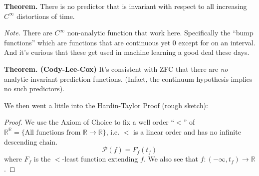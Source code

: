 \documentclass[12pt]{amsart}
\begin{document}
\begin{onehalfspace}
        \noindent\textbf{Theorem.} There is no predictor that is invariant with respect to all increasing $C^\infty$ distortions of
        time.

        \emph{Note.} There are $C^\infty$ non-analytic function that work here. Specifically the ``bump functions'' which
        are functions that are continuous yet 0 except for on an interval. And it's curious that these get used in machine
        learning a good deal these days.

        \noindent\textbf{Theorem. (Cody-Lee-Cox)} It's consistent with ZFC that there are \emph{no} analytic-invariant
        prediction functions. (Infact, the continuum hypothesis implies no such predictors).

        We then went a little into the Hardin-Taylor Proof (rough sketch):
        \begin{proof}
            We use the Axiom of Choice to fix a well order ``$<$'' of $\mathbb{R}^{\mathbb{R}} = \{\text{All functions from }\mathbb{R}\rightarrow\mathbb{R}\}$,
            i.e. $<$ is a linear order and has no infinite descending chain.
            \begin{displaymath}
                \mathcal{P}(f) = F_f(t_f)
            \end{displaymath}
            where $F_f$ is the $<$-least function extending $f$. We also see that $f:(-\infty,t_f)\rightarrow\mathbb{R}$.
        \end{proof}



        \noindent


    \end{onehalfspace}
\end{document}

